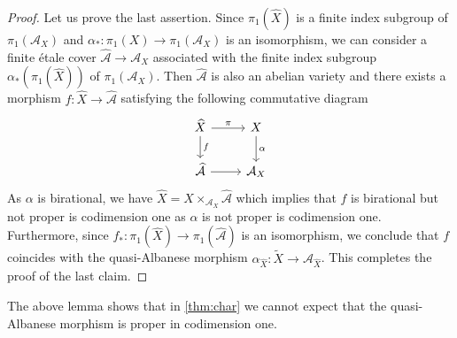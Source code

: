 \documentclass[11pt,english]{smfart}
\theoremstyle{plain}
\theoremstyle{definition}
\theoremstyle{remark}
\numberwithin{equation}{subsection}
\theoremstyle{plain}
\newcommand{\cA}{\mathcal A}
\begin{document}
\begin{proof}
 Let us prove the last assertion. Since $\pi_1(\widehat{X})$ is a finite index subgroup of $\pi_1(\cA_X)$ and $\alpha_*:\pi_1(X)\to \pi_1(\cA_X)$ is an isomorphism, we can consider a finite étale cover $ \widehat{\cA} \to \cA_X$ associated with the finite index subgroup  $\alpha_*(\pi_1(\widehat{X}))$   of $\pi_1(\cA_X)$. Then  $\widehat{\cA}$ is also an abelian variety and there exists  a morphism $f:\widehat{X}\to \widehat{\cA}$ satisfying the following commutative diagram 
 \begin{equation*}
 	\begin{tikzcd}
 		\widehat{X} \arrow[r,"\pi"]\arrow[d,"f"] & X\arrow[d,"\alpha"]\\
 		\widehat{\cA}\arrow[r] & \cA_{X}
 	\end{tikzcd}
 \end{equation*}
 As $\alpha$ is birational, we have $\widehat{X}=X\times_{\cA_X}\widehat{\cA}$ which implies that $f$ is birational but not proper is codimension one as $\alpha$ is not proper is codimension one.   Furthermore, since $f_*: \pi_1(\widehat{X}) \to \pi_1(\widehat{\cA})$ is an isomorphism, we conclude that  $f$ coincides with the quasi-Albanese morphism $\alpha_{\widehat{X}}:\widetilde{X}\to \cA_{\widehat{X}}$.   
This completes the proof of the last claim.
\end{proof}
The above lemma shows that in \cref{thm:char} we cannot expect that the quasi-Albanese morphism is   proper in codimension one.    
  
   
  
% 
% 
   
\end{document}
